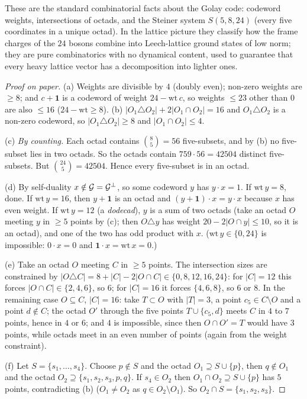 \begin{physics}
These are the standard combinatorial facts about the Golay code: codeword weights, intersections of octads, and the Steiner system $S(5,8,24)$ (every five coordinates in a unique octad). In the lattice picture they classify how the frame charges of the $24$ bosons combine into Leech-lattice ground states of low norm; they are pure combinatorics with no dynamical content, used to guarantee that every heavy lattice vector has a decomposition into lighter ones.
\end{physics}
\begin{proof}[Proof on paper]
(a) Weights are divisible by $4$ (doubly even); non-zero weights are $\ge8$; and $c+\mathbf 1$ is a codeword
of weight $24-\mathrm{wt}\,c$, so weights $\le 23$ other than $0$ are also $\le16$ ($24-\mathrm{wt}\ge8$).
(b) $|O_1\triangle O_2|+2|O_1\cap O_2|=16$ and $O_1\triangle O_2$ is a non-zero codeword, so
$|O_1\triangle O_2|\ge8$ and $|O_1\cap O_2|\le4$.

(c) \emph{By counting.}  Each octad contains $\binom85=56$ five-subsets, and by (b) no five-subset lies in
two octads.  So the octads contain $759\cdot56=42504$ distinct five-subsets.  But
$\binom{24}5=42504$.  Hence every five-subset is in an octad.

(d) By self-duality $x\notin\mathcal{G}=\mathcal{G}^\perp$, so some codeword $y$ has $y\cdot x=1$.  If
$\mathrm{wt}\,y=8$, done.  If $\mathrm{wt}\,y=16$, then $y+\mathbf 1$ is an octad and $(y+\mathbf
1)\cdot x=y\cdot x$ because $x$ has even weight.  If $\mathrm{wt}\,y=12$ (a \emph{dodecad}), $y$ is a sum of
two octads (take an octad $O$ meeting $y$ in $\ge5$ points by (c); then $O\triangle y$ has weight
$20-2|O\cap y|\le10$, so it is an octad), and one of the two has odd product with $x$.  ($\mathrm{wt}\,y\in\{0,24\}$
is impossible: $0\cdot x=0$ and $\mathbf 1\cdot x=\mathrm{wt}\,x=0$.)

(e) Take an octad $O$ meeting $C$ in $\ge5$ points.  The intersection sizes are constrained by
$|O\triangle C|=8+|C|-2|O\cap C|\in\{0,8,12,16,24\}$: for $|C|=12$ this forces $|O\cap C|\in\{2,4,6\}$, so
$6$; for $|C|=16$ it forces $\{4,6,8\}$, so $6$ or $8$.  In the remaining case $O\subseteq C$, $|C|=16$:
take $T\subset O$ with $|T|=3$, a point $c_5\in C\setminus O$ and a point $d\notin C$; the octad $O'$
through the five points $T\cup\{c_5,d\}$ meets $C$ in $4$ to $7$ points, hence in $4$ or $6$; and $4$ is
impossible, since then $O\cap O'=T$ would have $3$ points, while octads meet in an even number of points
(again from the weight constraint).

(f) Let $S=\{s_1,\dots,s_4\}$.  Choose $p\notin S$ and the octad $O_1\supseteq S\cup\{p\}$, then $q\notin O_1$
and the octad $O_2\supseteq\{s_1,s_2,s_3,p,q\}$.  If $s_4\in O_2$ then $O_1\cap O_2\supseteq S\cup\{p\}$ has
$5$ points, contradicting (b) ($O_1\neq O_2$ as $q\in O_2\setminus O_1$).  So $O_2\cap S=\{s_1,s_2,s_3\}$.
\end{proof}
